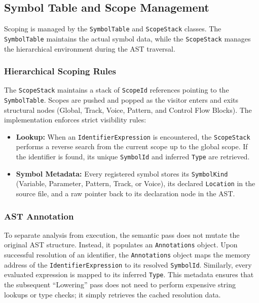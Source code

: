 \subsection{Symbol Table and Scope Management}\label{subsec:symbol-table-and-scope-management}

Scoping is managed by the \texttt{SymbolTable} and \texttt{ScopeStack} classes.
The \texttt{SymbolTable} maintains the actual symbol data, while the \texttt{ScopeStack} manages the hierarchical
environment during the AST traversal.

\subsubsection{Hierarchical Scoping Rules}

The \texttt{ScopeStack} maintains a stack of \texttt{ScopeId} references pointing to the \texttt{SymbolTable}.
Scopes are pushed and popped as the visitor enters and exits structural nodes (Global, Track, Voice, Pattern, and
Control Flow Blocks).
The implementation enforces strict visibility rules:
\begin{itemize}
  \item \textbf{Lookup:} When an \texttt{IdentifierExpression} is encountered, the \texttt{ScopeStack} performs a
    reverse search from the current scope up to the global scope.
    If the identifier is found, its unique \texttt{SymbolId} and inferred \texttt{Type} are retrieved.
  \item \textbf{Symbol Metadata:} Every registered symbol stores its \texttt{SymbolKind} (Variable, Parameter, Pattern,
    Track, or Voice), its declared \texttt{Location} in the source file, and a raw pointer back to its declaration node
    in the AST\@.
\end{itemize}

\subsubsection{AST Annotation}

To separate analysis from execution, the semantic pass does not mutate the original AST structure.
Instead, it populates an \texttt{Annotations} object.
Upon successful resolution of an identifier, the \texttt{Annotations} object maps the memory address of the
\texttt{IdentifierExpression} to its resolved \texttt{SymbolId}.
Similarly, every evaluated expression is mapped to its inferred \texttt{Type}.
This metadata ensures that the subsequent ``Lowering'' pass does not need to perform expensive string lookups or type
checks; it simply retrieves the cached resolution data.

